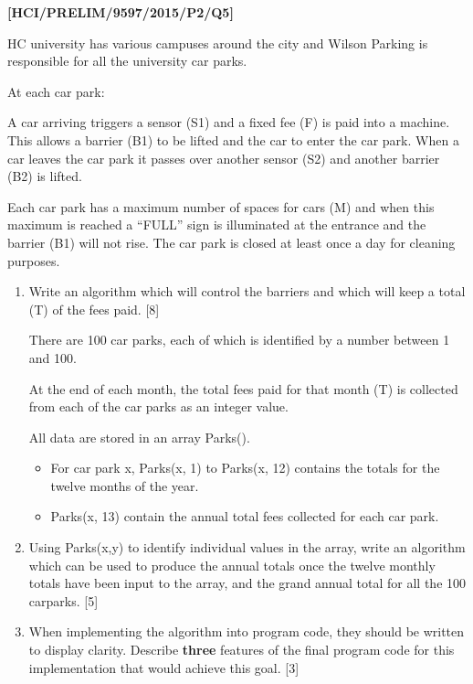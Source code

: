 \item \textbf{{[}HCI/PRELIM/9597/2015/P2/Q5{]} }

HC university has various campuses around the city and Wilson Parking
is responsible for all the university car parks.

At each car park:

A car arriving triggers a sensor (S1) and a fixed fee (F) is paid
into a machine. This allows a barrier (B1) to be lifted and the car
to enter the car park. When a car leaves the car park it passes over
another sensor (S2) and another barrier (B2) is lifted. 

Each car park has a maximum number of spaces for cars (M) and when
this maximum is reached a \textquotedblleft FULL\textquotedblright{}
sign is illuminated at the entrance and the barrier (B1) will not
rise. The car park is closed at least once a day for cleaning purposes. 
\begin{enumerate}
\item Write an algorithm which will control the barriers and which will
keep a total (T) of the fees paid. \hfill{}{[}8{]}

There are 100 car parks, each of which is identified by a number between
1 and 100. 

At the end of each month, the total fees paid for that month (T) is
collected from each of the car parks as an integer value. 

All data are stored in an array Parks(). 
\begin{itemize}
\item For car park x, Parks(x, 1) to Parks(x, 12) contains the totals for
the twelve months of the year.
\item Parks(x, 13) contain the annual total fees collected for each car
park.
\end{itemize}
\item Using Parks(x,y) to identify individual values in the array, write
an algorithm which can be used to produce the annual totals once the
twelve monthly totals have been input to the array, and the grand
annual total for all the 100 carparks. \hfill{}{[}5{]}
\item When implementing the algorithm into program code, they should be
written to display clarity. Describe \textbf{three} features of the
final program code for this implementation that would achieve this
goal. \hfill{}{[}3{]}
\end{enumerate}